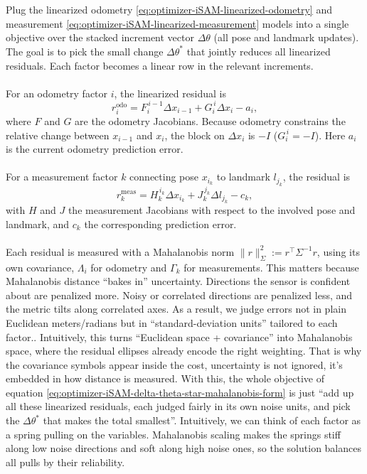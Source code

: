 \\ \\
Plug the linearized odometry \eqref{eq:optimizer-iSAM-linearized-odometry} and measurement \eqref{eq:optimizer-iSAM-linearized-measurement} models into a single objective over the stacked increment vector $\Delta\theta$ (all pose and landmark updates). The goal is to pick the small change $\Delta\theta^{*}$ that jointly reduces all linearized residuals. Each factor becomes a linear row in the relevant increments. 
\\ \\
For an odometry factor $i$, the linearized residual is
$$
r_i^{\text{odo}}=F_i^{\,i-1}\Delta x_{i-1}+G_i^{\,i}\Delta x_i-a_i,
$$
where $F$ and $G$ are the odometry Jacobians. Because odometry constrains the relative change between $x_{i-1}$ and $x_i$, the block on $\Delta x_i$ is $-I$ ($G_i^{\,i}=-I$). Here $a_i$ is the current odometry prediction error.
\\ \\
For a measurement factor $k$ connecting pose $x_{i_k}$ to landmark $l_{j_k}$, the residual is
$$
r_k^{\text{meas}}=H_k^{\,i_k}\Delta x_{i_k}+J_k^{\,j_k}\Delta l_{j_k}-c_k,
$$
with $H$ and $J$ the measurement Jacobians with respect to the involved pose and landmark, and $c_k$ the corresponding prediction error.
\\ \\
Each residual is measured with a Mahalanobis norm $\|r\|_{\Sigma}^2 := r^\top \Sigma^{-1} r$, using its own covariance, $\Lambda_i$ for odometry and $\Gamma_k$ for measurements. This matters because Mahalanobis distance ``bakes in'' uncertainty. Directions the sensor is confident about are penalized more. Noisy or correlated directions are penalized less, and the metric tilts along correlated axes. As a result, we judge errors not in plain Euclidean meters/radians but in ``standard-deviation units'' tailored to each factor.. Intuitively, this turns ``Euclidean space + covariance'' into Mahalanobis space, where the residual ellipses already encode the right weighting. That is why the covariance symbols appear inside the cost, uncertainty is not ignored, it's embedded in how distance is measured. With this, the whole objective of equation \eqref{eq:optimizer-iSAM-delta-theta-star-mahalanobis-form} is just ``add up all these linearized residuals, each judged fairly in its own noise units, and pick the $\Delta\theta^{*}$ that makes the total smallest''. Intuitively, we can think of each factor as a spring pulling on the variables. Mahalanobis scaling makes the springs stiff along low noise directions and soft along high noise ones, so the solution balances all pulls by their reliability.
